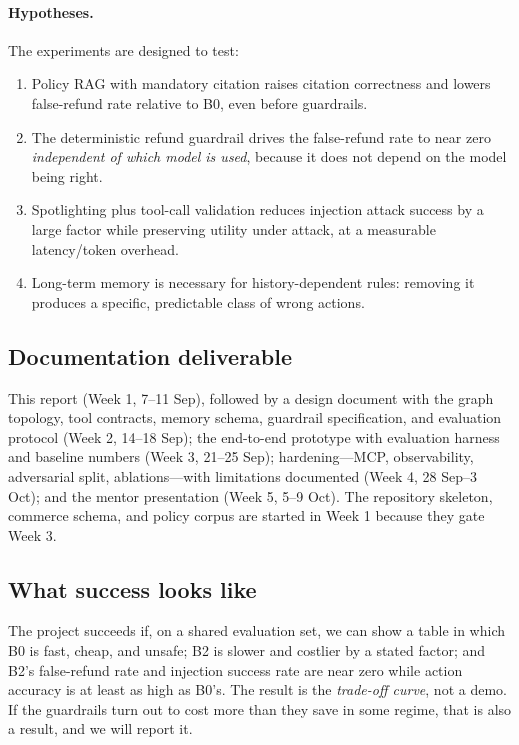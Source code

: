 \documentclass[11pt,a4paper]{article}
\begin{document}
\paragraph{Hypotheses.} The experiments are designed to test:
\begin{enumerate}[label=\textbf{H\arabic*.}]
  \item Policy RAG with mandatory citation raises citation correctness and lowers false-refund rate relative to B0, even before guardrails.
  \item The deterministic refund guardrail drives the false-refund rate to near zero \emph{independent of which model is used}, because it does not depend on the model being right.
  \item Spotlighting plus tool-call validation reduces injection attack success by a large factor while preserving utility under attack, at a measurable latency/token overhead.
  \item Long-term memory is necessary for history-dependent rules: removing it produces a specific, predictable class of wrong actions.
\end{enumerate}

\subsection{Documentation deliverable}

This report (Week 1, 7--11 Sep), followed by a design document with the graph topology, tool contracts, memory schema, guardrail specification, and evaluation protocol (Week 2, 14--18 Sep); the end-to-end prototype with evaluation harness and baseline numbers (Week 3, 21--25 Sep); hardening---MCP, observability, adversarial split, ablations---with limitations documented (Week 4, 28 Sep--3 Oct); and the mentor presentation (Week 5, 5--9 Oct). The repository skeleton, commerce schema, and policy corpus are started in Week 1 because they gate Week 3.

\subsection{What success looks like}

The project succeeds if, on a shared evaluation set, we can show a table in which B0 is fast, cheap, and unsafe; B2 is slower and costlier by a stated factor; and B2's false-refund rate and injection success rate are near zero while action accuracy is at least as high as B0's. The result is the \emph{trade-off curve}, not a demo. If the guardrails turn out to cost more than they save in some regime, that is also a result, and we will report it.
\end{document}
